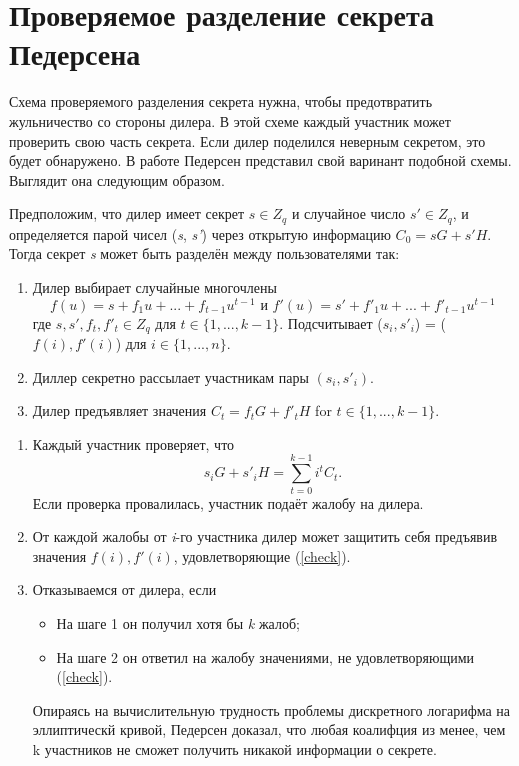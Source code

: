 \section{Проверяемое разделение секрета Педерсена}

Схема проверяемого разделения секрета нужна, чтобы предотвратить жульничество со стороны дилера. В этой схеме каждый участник может проверить свою часть секрета. Если дилер поделился неверным секретом, это будет обнаружено. В работе \cite{VSS} Педерсен представил свой варинант подобной схемы. Выглядит она следующим образом.

Предположим, что дилер имеет секрет $s \in Z_q$ и случайное число $s' \in Z_q$, и определяется парой чисел (\textit{s}, \textit{s'}) через открытую информацию $C_0 = sG + s'H.$ Тогда секрет \textit{s} может быть разделён между пользователями так:

\begin{enumerate}
    \item Дилер выбирает случайные многочлены
    $$ f(u) = s + f_1u + ...+f_{t-1}u^{t-1} \text{ и } f'(u) = s' + f'_1u + ... + f'_{t-1}u^{t-1}$$
    где $s, s', f_t, f'_t \in Z_q$ для $t \in \{1, ... , k-1\}$. Подсчитывает ($s_i, s'_i$) = ($f(i), f'(i)$) для $i \in \{1, ..., n\}$.

    \item Диллер секретно рассылает участникам пары $(s_i, s'_i)$.

    \item Дилер предъявляет значения $C_t = f_tG + f'_tH$ for $t \in \{1, ..., k-1\}$.
\end{enumerate}

\begin{enumerate}
    \item Каждый участник проверяет, что 
    \begin{equation}\label{check}
        s_iG + s'_iH = \sum_{t=0}^{k-1}i^tC_t. 
    \end{equation}
     Если проверка провалилась, участник подаёт жалобу на дилера.
     \item От каждой жалобы от \textit{i}-го участника дилер может защитить себя предъявив значения $f(i), f'(i)$, удовлетворяющие (\ref{check}).
     \item Отказываемся от дилера, если
     \begin{itemize}
         \item На шаге 1 он получил хотя бы \textit{k} жалоб;
         \item На шаге 2 он ответил на жалобу значениями, не удовлетворяющими (\ref{check}).
     \end{itemize}

     Опираясь на вычислительную трудность проблемы дискретного логарифма на эллиптическй кривой, Педерсен доказал, что любая коалифция из менее, чем k участников не сможет получить никакой информации о секрете.
\end{enumerate}


